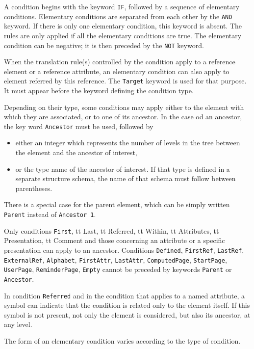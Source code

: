 A condition begins with the keyword {\tt IF}, followed by a sequence
of elementary conditions.  Elementary conditions are separated from
each other by the {\tt AND} keyword.  If there is only one elementary
condition, this keyword is absent.  The rules are only applied if all
the elementary conditions are true.  The elementary condition can be
negative; it is then preceded by the {\tt NOT} keyword.

When the translation rule(s) controlled by the condition apply to a
reference element or a reference attribute, an elementary condition
can also apply to element referred by this reference.  The {\tt Target}
keyword is used for that purpose.  It must appear before the keyword
defining the condition type.

Depending on their type, some conditions may apply either to the element
with which they are associated, or to one of its ancestor.  In the case
od an ancestor, the key word {\tt Ancestor} must be used, followed by
\begin{itemize}
\item either an integer which represents the number of levels in the
   tree between the element and the ancestor of interest,
\item or the type name of the ancestor of interest.  If that type is
   defined in a separate structure schema, the name of that schema must
   follow between parentheses.
\end{itemize}
There is a special case for the parent element, which can be simply
written {\tt Parent} instead of {\tt Ancestor 1}.

Only conditions {\tt First}, {tt Last}, {tt Referred}, {tt Within},
{tt Attributes}, {tt Presentation}, {tt Comment} and those concerning
an attribute or a specific presentation can apply to an ancestor.
Conditions {\tt Defined}, {\tt FirstRef},
{\tt LastRef}, {\tt ExternalRef}, {\tt Alphabet}, {\tt FirstAttr},
{\tt LastAttr}, {\tt ComputedPage}, {\tt StartPage}, {\tt UserPage},
{\tt ReminderPage}, {\tt Empty} cannot be preceded by keywords
{\tt Parent} or {\tt Ancestor}.

In condition {\tt Referred} and in the condition that applies to
a named attribute, a symbol {\tt *} can indicate that the condition
is related only to the element itself. If this symbol is not present,
not only the element is considered, but also its ancestor, at any level.

The form of an elementary condition varies according to the type of
condition.

